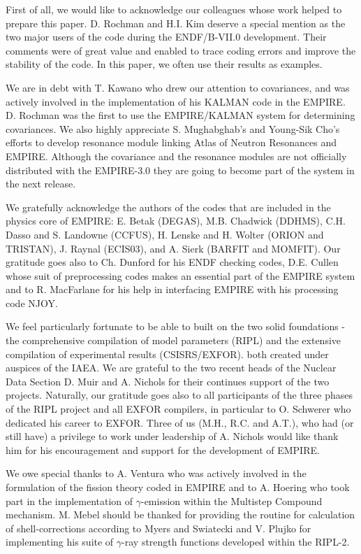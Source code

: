 First of all, we would like to acknowledge our colleagues whose work helped
to prepare this paper. D. Rochman and H.I. Kim deserve a special mention as
the two major users of the code during the ENDF/B-VII.0 development. Their
comments were of great value and enabled to trace coding errors and improve
the stability of the code. In this paper, we often use their results as
examples.

We are in debt with T. Kawano who drew our attention to covariances, and was
actively involved in the implementation of his KALMAN code in the EMPIRE. D.
Rochman was the first to use the EMPIRE/KALMAN system for determining
covariances. We also highly appreciate S. Mughabghab's and Young-Sik Cho's
efforts to develop resonance module linking Atlas of Neutron Resonances and
EMPIRE. Although the covariance and the resonance modules are not officially
distributed with the EMPIRE-3.0 they are going to become part of the system
in the next release.

We gratefully acknowledge the authors of the codes that are included in the
physics core of EMPIRE: E. Betak (DEGAS), M.B. Chadwick (DDHMS), C.H. Dasso
and S. Landowne (CCFUS), H. Lenske and H. Wolter (ORION and TRISTAN), J.
Raynal (ECIS03), and A. Sierk (BARFIT and MOMFIT). Our gratitude goes also
to Ch. Dunford for his ENDF checking codes, D.E. Cullen whose suit of
preprocessing codes makes an essential part of the EMPIRE system and to R.
MacFarlane for his help in interfacing EMPIRE with his processing code NJOY.

We feel particularly fortunate to be able to built on the two solid
foundations - the comprehensive compilation of model parameters (RIPL) and
the extensive compilation of experimental results (CSISRS/EXFOR). both
created under auspices of the IAEA. We are grateful to the two recent heads
of the Nuclear Data Section D. Muir and A. Nichols for their continues
support of the two projects. Naturally, our gratitude goes also to all
participants of the three phases of the RIPL project and all EXFOR
compilers, in particular to O. Schwerer who dedicated his career to EXFOR.
Three of us (M.H., R.C. and A.T.), who had (or still have) a privilege to
work under leadership of A. Nichols would like thank him for his
encouragement and support for the development of EMPIRE.

We owe special thanks to A. Ventura who was actively involved in the
formulation of the fission theory coded in EMPIRE and to A. Hoering who took
part in the implementation of $\gamma$-emission within the Multistep
Compound mechanism. M. Mebel should be thanked for providing the routine for
calculation of shell-corrections according to Myers and Swiatecki and V.
Plujko for implementing his suite of $\gamma$-ray strength functions
developed within the RIPL-2.

